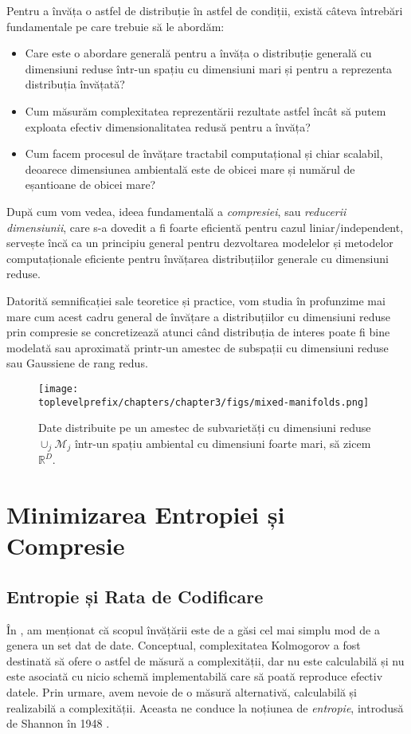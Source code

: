 \documentclass[../../book-main_ro.tex]{subfiles}
\begin{document}
Pentru a învăța o astfel de distribuție în astfel de condiții, există câteva întrebări fundamentale pe care trebuie să le abordăm:
\begin{itemize}
	\item Care este o abordare generală pentru a învăța o distribuție generală cu dimensiuni reduse într-un spațiu cu dimensiuni mari și pentru a reprezenta distribuția învățată?
	\item Cum măsurăm complexitatea reprezentării rezultate astfel încât să putem exploata efectiv dimensionalitatea redusă pentru a învăța?
	\item Cum facem procesul de învățare tractabil computațional și chiar scalabil, deoarece dimensiunea ambientală este de obicei mare și numărul de eșantioane de obicei mare?
\end{itemize}
După cum vom vedea, ideea fundamentală a {\em compresiei}, sau {\em reducerii dimensiunii}, care s-a dovedit a fi foarte eficientă pentru cazul liniar/independent, servește încă ca un principiu general pentru dezvoltarea modelelor și metodelor computaționale eficiente pentru învățarea distribuțiilor generale cu dimensiuni reduse.

Datorită semnificației sale teoretice și practice, vom studia în profunzime mai mare cum acest cadru general de învățare a distribuțiilor cu dimensiuni reduse prin compresie se concretizează atunci când distribuția de interes poate fi bine modelată sau aproximată printr-un amestec de subspații cu dimensiuni reduse sau Gaussiene de rang redus.

\begin{figure}
    \centering
    \texttt{[image: \\toplevelprefix/chapters/chapter3/figs/mixed-manifolds.png]}
    \caption{Date distribuite pe un amestec de subvarietăți cu dimensiuni reduse $\cup_j \mathcal{M}_j$ într-un spațiu ambiental cu dimensiuni foarte mari, să zicem $\mathbb{R}^D$.}
    \label{fig:mixture-manifolds}
\end{figure}


\section{Minimizarea Entropiei și Compresie}

\subsection{Entropie și Rata de Codificare}
În , am menționat că scopul învățării este de a găsi cel mai simplu mod de a genera un set dat de date. Conceptual, complexitatea Kolmogorov a fost destinată să ofere o astfel de măsură a complexității, dar nu este calculabilă și nu este asociată cu nicio schemă implementabilă care să poată reproduce efectiv datele. Prin urmare, avem nevoie de o măsură alternativă, calculabilă și realizabilă a complexității. Aceasta ne conduce la noțiunea de {\em entropie}, introdusă de Shannon în 1948 \cite{Shannon-1948}.
\end{document}
